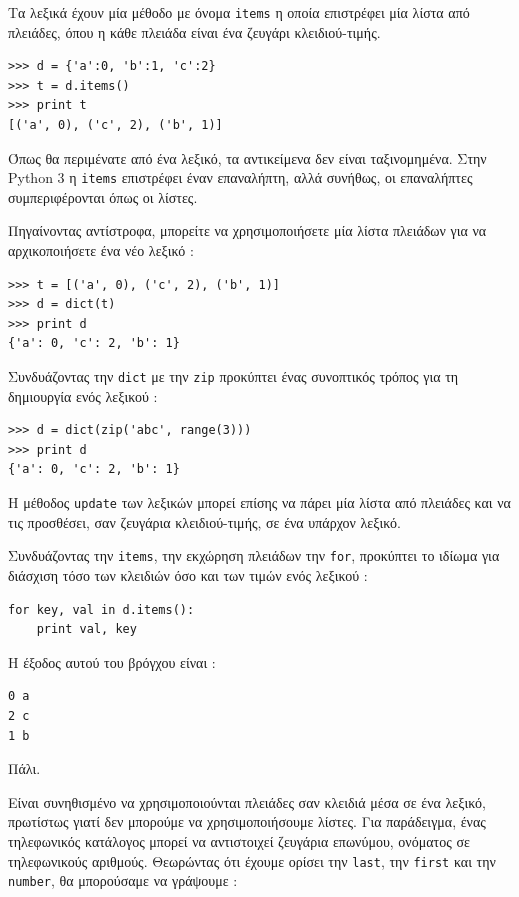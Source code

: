 \documentclass[10pt]{book}
\begin{document}
Τα λεξικά έχουν μία μέθοδο με όνομα  {\tt items}  η οποία επιστρέφει μία λίστα από πλειάδες, όπου η κάθε πλειάδα είναι ένα ζευγάρι κλειδιού-τιμής.


\begin{verbatim}
>>> d = {'a':0, 'b':1, 'c':2}
>>> t = d.items()
>>> print t
[('a', 0), ('c', 2), ('b', 1)]
\end{verbatim}
%
 Όπως θα περιμένατε από ένα λεξικό, τα αντικείμενα δεν είναι ταξινομημένα. Στην  Python 3  η  {\tt items}  επιστρέφει  έναν επαναλήπτη, αλλά συνήθως, οι επαναλήπτες συμπεριφέρονται όπως οι λίστες.

Πηγαίνοντας αντίστροφα, μπορείτε να χρησιμοποιήσετε μία λίστα πλειάδων για να αρχικοποιήσετε ένα νέο λεξικό :

\begin{verbatim}
>>> t = [('a', 0), ('c', 2), ('b', 1)]
>>> d = dict(t)
>>> print d
{'a': 0, 'c': 2, 'b': 1}
\end{verbatim}

 Συνδυάζοντας την  {\tt dict}  με την  {\tt zip}  προκύπτει ένας συνοπτικός τρόπος για τη δημιουργία ενός λεξικού :

\begin{verbatim}
>>> d = dict(zip('abc', range(3)))
>>> print d
{'a': 0, 'c': 2, 'b': 1}
\end{verbatim}
%
 Η μέθοδος  {\tt update}  των λεξικών μπορεί επίσης να πάρει μία λίστα από πλειάδες και να τις προσθέσει, σαν ζευγάρια κλειδιού-τιμής, σε ένα υπάρχον λεξικό.

Συνδυάζοντας την  {\tt items},  την εκχώρηση πλειάδων την  {\tt for},  προκύπτει το ιδίωμα για διάσχιση τόσο των κλειδιών όσο και των τιμών ενός λεξικού :

\begin{verbatim}
for key, val in d.items():
    print val, key
\end{verbatim}
%
 Η έξοδος αυτού του βρόγχου είναι :

\begin{verbatim}
0 a
2 c
1 b
\end{verbatim}
%
 Πάλι.

Είναι συνηθισμένο να χρησιμοποιούνται πλειάδες σαν κλειδιά μέσα σε ένα λεξικό, πρωτίστως γιατί δεν μπορούμε να χρησιμοποιήσουμε λίστες. Για παράδειγμα, ένας τηλεφωνικός κατάλογος μπορεί να αντιστοιχεί ζευγάρια επωνύμου, ονόματος σε τηλεφωνικούς αριθμούς. Θεωρώντας ότι έχουμε ορίσει την  {\tt last},  την  {\tt first}  και την  {\tt number},  θα μπορούσαμε να γράψουμε :
\end{document}
